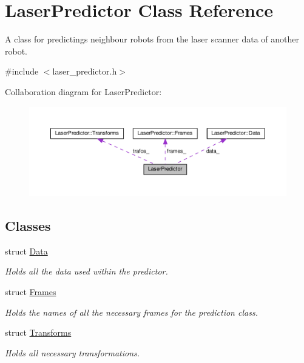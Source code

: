 \hypertarget{classLaserPredictor}{}\section{Laser\+Predictor Class Reference}
\label{classLaserPredictor}


A class for predictings neighbour robots from the laser scanner data of another robot.  




{\ttfamily \#include $<$laser\+\_\+predictor.\+h$>$}



Collaboration diagram for Laser\+Predictor\+:\nopagebreak
\begin{figure}[H]
\begin{center}
\leavevmode
\includegraphics[width=350pt]{db/d2d/classLaserPredictor__coll__graph}
\end{center}
\end{figure}
\subsection*{Classes}
\begin{DoxyCompactItemize}
\item 
struct \hyperlink{structLaserPredictor_1_1Data}{Data}
\begin{DoxyCompactList}\small\item\em Holds all the data used within the predictor. \end{DoxyCompactList}\item 
struct \hyperlink{structLaserPredictor_1_1Frames}{Frames}
\begin{DoxyCompactList}\small\item\em Holds the names of all the necessary frames for the prediction class. \end{DoxyCompactList}\item 
struct \hyperlink{structLaserPredictor_1_1Transforms}{Transforms}
\begin{DoxyCompactList}\small\item\em Holds all necessary transformations. \end{DoxyCompactList}\end{DoxyCompactItemize}
